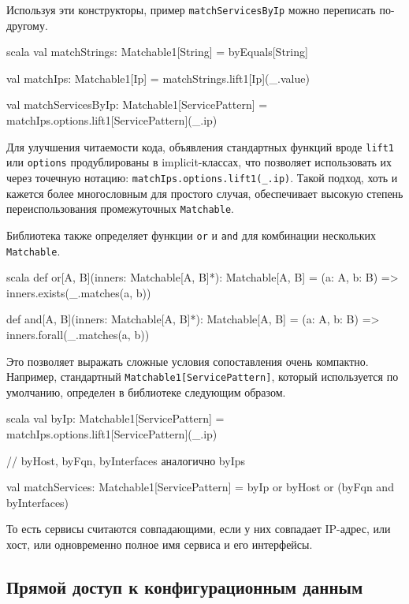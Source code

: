 Используя эти конструкторы, пример \verb|matchServicesByIp| можно переписать по-другому.

\begin{code}{scala}
val matchStrings: Matchable1[String] = 
  byEquals[String]

val matchIps: Matchable1[Ip] =
  matchStrings.lift1[Ip](_.value)

val matchServicesByIp: Matchable1[ServicePattern] =
  matchIps.options.lift1[ServicePattern](_.ip)
\end{code}

Для улучшения читаемости кода, объявления стандартных функций вроде \verb|lift1| или \verb|options| продублированы в implicit-классах, что позволяет использовать их через точечную нотацию: \verb|matchIps.options.lift1(_.ip)|. Такой подход, хоть и кажется более многословным для простого случая, обеспечивает высокую степень переиспользования промежуточных \verb|Matchable|.

Библиотека также определяет функции \verb|or| и \verb|and| для комбинации нескольких \verb|Matchable|.

\begin{codenl}{scala}
def or[A, B](inners: Matchable[A, B]*): Matchable[A, B] =
  (a: A, b: B) => inners.exists(_.matches(a, b))

def and[A, B](inners: Matchable[A, B]*): Matchable[A, B] =
  (a: A, b: B) => inners.forall(_.matches(a, b))
\end{codenl}

Это позволяет выражать сложные условия сопоставления очень компактно. Например, стандартный \verb|Matchable1[ServicePattern]|, который используется по умолчанию, определен в библиотеке следующим образом.

\begin{code}{scala}
val byIp: Matchable1[ServicePattern] = 
  matchIps.options.lift1[ServicePattern](_.ip)

// byHost, byFqn, byInterfaces аналогично byIps

val matchServices: Matchable1[ServicePattern] =
  byIp or byHost or (byFqn and byInterfaces)
\end{code}

То есть сервисы считаются совпадающими, если у них совпадает IP-адрес, или хост, или одновременно полное имя сервиса и его интерфейсы.

\subsection{Прямой доступ к конфигурационным данным}

